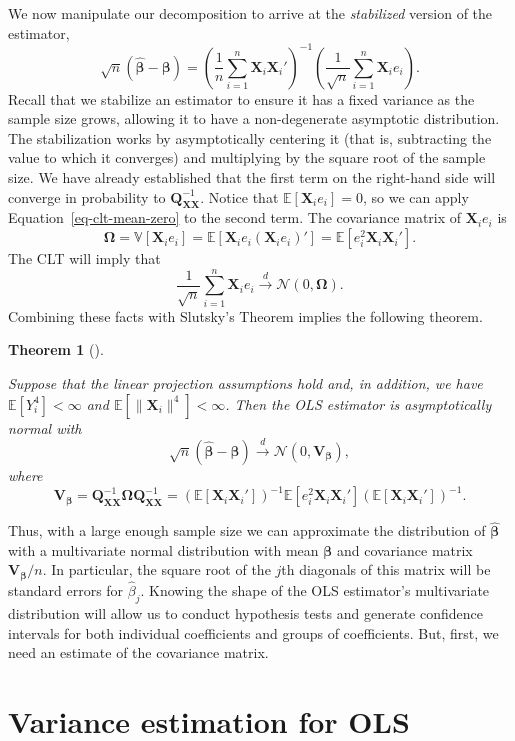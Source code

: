 \documentclass[
  13pt,
  letterpaper,
  DIV=11,
  numbers=noendperiod]{scrreprt}
\newcommand{\mb}{\bm}
\newcommand{\E}{\mathbb{E}}
\newcommand{\V}{\mathbb{V}}
\newcommand{\N}{\mathcal{N}}
\newcommand{\X}{\mb{X}}
\newcommand{\bfbeta}{\mb{\beta}}
\newcommand{\bhat}{\widehat{\mb{\beta}}}
\newcommand{\indist}{\overset{d}{\to}}
\theoremstyle{plain}
\newtheorem{theorem}{Theorem}[chapter]
\theoremstyle{plain}
\theoremstyle{definition}
\theoremstyle{definition}
\theoremstyle{remark}
\begin{document}
We now manipulate our decomposition to arrive at the \emph{stabilized}
version of the estimator, \[ 
\sqrt{n}\left( \bhat - \bfbeta\right) = \left( \frac{1}{n} \sum_{i=1}^n \X_i\X_i' \right)^{-1} \left( \frac{1}{\sqrt{n}} \sum_{i=1}^n \X_ie_i \right).
\] Recall that we stabilize an estimator to ensure it has a fixed
variance as the sample size grows, allowing it to have a non-degenerate
asymptotic distribution. The stabilization works by asymptotically
centering it (that is, subtracting the value to which it converges) and
multiplying by the square root of the sample size. We have already
established that the first term on the right-hand side will converge in
probability to \(\mb{Q}_{\X\X}^{-1}\). Notice that
\(\E[\X_{i}e_{i}] = 0\), so we can apply Equation~\ref{eq-clt-mean-zero}
to the second term. The covariance matrix of \(\X_ie_{i}\) is \[ 
\mb{\Omega} = \V[\X_{i}e_{i}] = \E[\X_{i}e_{i}(\X_{i}e_{i})'] = \E[e_{i}^{2}\X_{i}\X_{i}'].
\] The CLT will imply that \[ 
\frac{1}{\sqrt{n}} \sum_{i=1}^n \X_ie_i \indist \N(0, \mb{\Omega}).
\] Combining these facts with Slutsky's Theorem implies the following
theorem.

\begin{theorem}[]\protect\hypertarget{thm-ols-asymptotic-normality}{}\label{thm-ols-asymptotic-normality}

Suppose that the linear projection assumptions hold and, in addition, we
have \(\E[Y_{i}^{4}] < \infty\) and
\(\E[\lVert\X_{i}\rVert^{4}] < \infty\). Then the OLS estimator is
asymptotically normal with \[ 
\sqrt{n}\left( \bhat - \bfbeta\right) \indist \N(0, \mb{V}_{\bfbeta}),
\] where \[ 
\mb{V}_{\bfbeta} = \mb{Q}_{\X\X}^{-1}\mb{\Omega}\mb{Q}_{\X\X}^{-1} = \left( \E[\X_i\X_i'] \right)^{-1}\E[e_i^2\X_i\X_i']\left( \E[\X_i\X_i'] \right)^{-1}.
\]

\end{theorem}

Thus, with a large enough sample size we can approximate the
distribution of \(\bhat\) with a multivariate normal distribution with
mean \(\bfbeta\) and covariance matrix \(\mb{V}_{\bfbeta}/n\). In
particular, the square root of the \(j\)th diagonals of this matrix will
be standard errors for \(\widehat{\beta}_j\). Knowing the shape of the
OLS estimator's multivariate distribution will allow us to conduct
hypothesis tests and generate confidence intervals for both individual
coefficients and groups of coefficients. But, first, we need an estimate
of the covariance matrix.

\section{Variance estimation for OLS}\label{variance-estimation-for-ols}
\end{document}
